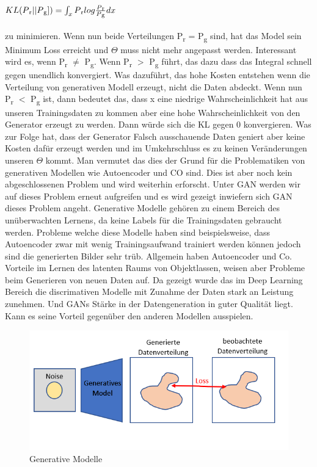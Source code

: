 \documentclass{llncs}
\begin{document}
\begin{math}
KL(P\textsubscript{r}|| P\textsubscript{g}])=\int_x P\textsubscript{r}log\frac{P\textsubscript{r}}{P\textsubscript{g}}dx                     
\end{math}
\\
\\
zu minimieren. Wenn nun beide Verteilungen P\textsubscript{r} = P\textsubscript{g} sind, hat das Model sein Minimum Loss erreicht und $\Theta$ muss nicht mehr angepasst werden. Interessant wird es, wenn P\textsubscript{r} $\ne$ P\textsubscript{g}.
Wenn  P\textsubscript{r} $>$ P\textsubscript{g} führt, das dazu dass das Integral schnell gegen unendlich konvergiert. Was dazuführt, das hohe Kosten entstehen wenn die  Verteilung von generativen Modell erzeugt, nicht die Daten abdeckt. Wenn nun  P\textsubscript{r} $<$ P\textsubscript{g} ist, dann bedeutet das, dass x eine niedrige Wahrscheinlichkeit hat aus unseren Trainingsdaten zu kommen aber eine hohe Wahrscheinlichkeit von den Generator erzeugt zu werden. Dann würde sich die KL gegen 0 konvergieren. Was zur Folge hat, dass der Generator Falsch ausschauende Daten geniert aber keine Kosten dafür erzeugt werden und im Umkehrschluss es zu keinen Veränderungen unseren $\Theta$ kommt. Man vermutet das dies der Grund für die Problematiken von generativen Modellen wie Autoencoder und CO sind. Dies ist aber noch kein abgeschlossenen Problem und wird weiterhin erforscht\cite{improvingan}.
Unter GAN werden wir auf dieses Problem erneut aufgreifen und es wird gezeigt inwiefern sich GAN dieses Problem angeht. Generative Modelle gehören zu einem Bereich des unüberwachten Lernens, da keine Labels für die Trainingsdaten gebraucht werden. Probleme welche diese Modelle haben sind beispielsweise, dass Autoencoder zwar mit wenig Trainingsaufwand trainiert werden können jedoch sind die generierten Bilder sehr trüb. Allgemein haben Autoencoder und Co. Vorteile  im Lernen des latenten Raums von Objektlassen, weisen aber Probleme beim Generieren von neuen Daten auf. Da gezeigt wurde das im Deep Learning Bereich die discrimativen Modelle mit Zunahme der Daten stark an Leistung zunehmen. Und GANs Stärke in der Datengeneration in guter Qualität liegt. Kann es seine Vorteil gegenüber den anderen Modellen ausspielen\cite{improvingan}.

\begin{figure}[htbp] 
	\centering
	\includegraphics[width=1.0\textwidth]{genmodel.png}
	\caption{Generative Modelle}
	\label{fig:Bild1}
\end{figure}
\end{document}
